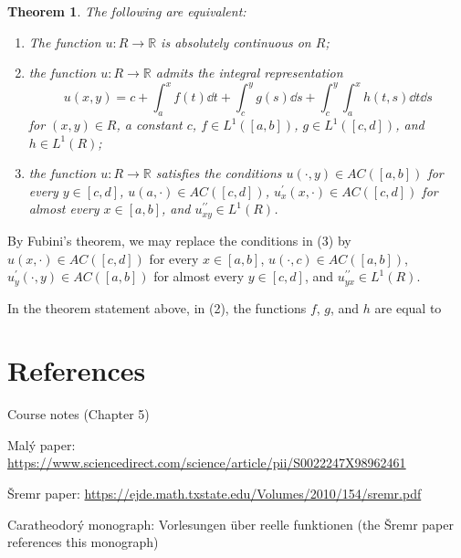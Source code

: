 \documentclass[11pt,leqno]{article}
\theoremstyle{plain}
\newtheorem{theorem}[lem]{Theorem}
\theoremstyle{definition}
\numberwithin{equation}{section}
\numberwithin{lem}{section}
\begin{document}
\begin{theorem}
    The following are equivalent:\begin{enumerate}[label=\textup{(\arabic*)}]
        \item The function $u\colon R\to\mathbb R$ is absolutely continuous on $R$;
        \item the function $u\colon R\to\mathbb R$ admits the integral representation 
        \begin{equation}
            u(x,y) = c + \int_a^x f(t)\dd t + \int_c^y g(s)\dd s + \int_c^y\int_a^x h(t,s)\dd t \dd s
        \end{equation}
        for $(x,y)\in R$, a constant $c$, $f\in L^1([a,b])$, $g\in L^1([c,d])$, and $h\in L^1(R)$;
        \item the function $u\colon R\to\mathbb R$ satisfies the conditions $u(\cdot,y)\in AC([a,b])$ for every $y\in [c,d]$, $u(a,\cdot)\in AC([c,d])$, $u^\prime_x(x,\cdot)\in AC([c,d])$ for almost every $x\in [a,b]$, and $u^{\prime\prime}_{xy}\in L^1(R)$.
    \end{enumerate}
\end{theorem}
By Fubini's theorem, we may replace the conditions in (3) by $u(x,\cdot)\in AC([c,d])$ for every $x\in [a,b]$, $u(\cdot,c)\in AC([a,b])$, $u^\prime_y(\cdot,y)\in AC([a,b])$ for almost every $y\in [c,d]$, and $u^{\prime\prime}_{yx}\in L^1(R)$.

In the theorem statement above, in (2), the functions $f$, $g$, and $h$ are equal to 
\newpage
\section*{References}
Course notes (Chapter 5)

Mal\'y paper: \href{https://www.sciencedirect.com/science/article/pii/S0022247X98962461}{https://www.sciencedirect.com/science/article/pii/S0022247X98962461}

\v Sremr paper: \href{https://ejde.math.txstate.edu/Volumes/2010/154/sremr.pdf}{https://ejde.math.txstate.edu/Volumes/2010/154/sremr.pdf}

Caratheodor\'y monograph: Vorlesungen über reelle funktionen (the \v Sremr paper references this monograph)
\end{document}
